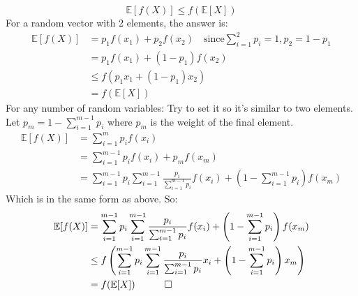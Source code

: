\documentclass{article}
\begin{document}
\begin{equation*}
	\mathbb{E}[f(X)] \leq f(\mathbb{E}[X])
\end{equation*}
For a random vector with 2 elements, the answer is:
\begin{align*}
	\mathbb{E}[f(X)] &= p_1f(x_1) + p_2f(x_2) \quad \text{since} \sum_{i=1}^2{p_i}=1, p_2 = 1 - p_1\\
	&= p_1f(x_1) + (1-p_1)f(x_2) \\
	&\leq f(p_1x_1 + (1 - p_1)x_2) \\
	&= f(\mathbb{E}[X])
\end{align*}
For any number of random variables: \newline
Try to set it so it's similar to two elements. Let $p_m = 1 - \sum_{i=1}^{m-1}{p_i}$ where $p_m$ is the weight of the final element. 
\begin{align*}
	\mathbb{E}[f(X)] &= \sum_{i=1}^m{p_if(x_i)} \\
	&= \sum_{i=1}^{m-1}{p_if(x_i)} + p_mf(x_m) \\
	&=  \sum_{i=1}^{m-1}{p_i} \sum_{i=1}^{m-1}{\frac{p_i}{\sum_{i=1}^{m-1}{p_i}}f(x_i)} + \left(1 - \sum_{i=1}^{m-1}{p_i}\right)f(x_m)
\end{align*}
Which is in the same form as above. So:
\begin{align*}
	\mathbb{E}[f(X)] &=\sum_{i=1}^{m-1}{p_i} \sum_{i=1}^{m-1}{\frac{p_i}{\sum_{i=1}^{m-1}{p_i}}f(x_i)} + \left(1 - \sum_{i=1}^{m-1}{p_i}\right)f(x_m) \\
	&\leq f\left(\sum_{i=1}^{m-1}{p_i} \sum_{i=1}^{m-1}{\frac{p_i}{\sum_{i=1}^{m-1}{p_i}}x_i} + \left(1 - \sum_{i=1}^{m-1}{p_i}\right)x_m \right) \\
	&= f(\mathbb{E}[X]) \quad \qed
\end{align*}
\end{document}
